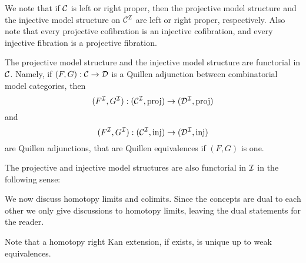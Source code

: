 We note that if $\mathcal{C}$ is left or right proper, then the projective model structure and the injective model structure on $\mathcal{C}^{\mathcal{I}}$ 
are left or right proper, respectively. Also note that every projective cofibration is an injective cofibration, and every
injective fibration is a projective fibration.

The projective model structure and the injective model structure are functorial in $\mathcal{C}$. Namely, if $(F,G):\mathcal{C}\to\mathcal{D}$ is a 
Quillen adjunction between combinatorial model categories, then $$(F^{\mathcal{I}},G^{\mathcal{I}}):(\mathcal{C}^{\mathcal{I}},\text{proj})\to(\mathcal{D}^{\mathcal{I}},\text{proj})$$
and $$(F^{\mathcal{I}},G^{\mathcal{I}}):(\mathcal{C}^{\mathcal{I}},\text{inj})\to(\mathcal{D}^{\mathcal{I}},\text{inj})$$ are Quillen adjunctions, that are Quillen equivalences 
if $(F,G)$ is one.

The projective and injective model structures are also functorial in $\mathcal{I}$ in the following sense:


We now discuss homotopy limits and colimits. Since the concepts are dual to each other we only give discussions to homotopy limits,
leaving the dual statements for the reader. 


Note that a homotopy right Kan extension, if exists, is unique up to weak equivalences.


